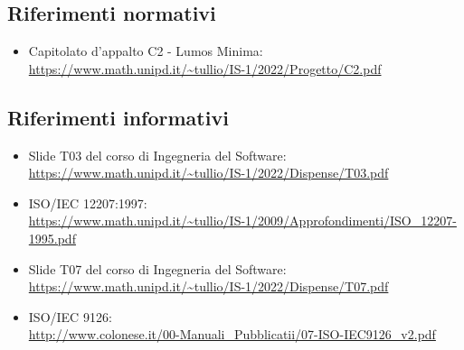 \subsection{Riferimenti normativi}
\begin{itemize}
    \item Capitolato d'appalto C2 - Lumos Minima: \\ \url{https://www.math.unipd.it/~tullio/IS-1/2022/Progetto/C2.pdf}
\end{itemize}

\subsection{Riferimenti informativi}
\begin{itemize}
    \item Slide T03 del corso di Ingegneria del Software: \\ \url{https://www.math.unipd.it/~tullio/IS-1/2022/Dispense/T03.pdf}
    \item ISO/IEC 12207:1997: \\ \url{https://www.math.unipd.it/~tullio/IS-1/2009/Approfondimenti/ISO_12207-1995.pdf}
    \item Slide T07 del corso di Ingegneria del Software: \\ \url{https://www.math.unipd.it/~tullio/IS-1/2022/Dispense/T07.pdf}
    \item ISO/IEC 9126: \\ \url{http://www.colonese.it/00-Manuali_Pubblicatii/07-ISO-IEC9126_v2.pdf}
\end{itemize}